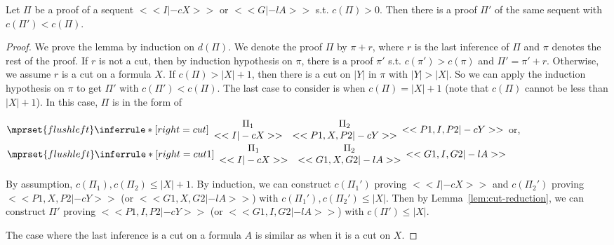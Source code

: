 \begin{lemma}
  \label{lem:less-cut-rank}
  Let $\Pi$ be a proof of a sequent $<<I |-c X>>$ or $<<G |-l A>>$ s.t. $c(\Pi)>0$. Then there
  is a proof $\Pi'$ of the same sequent with $c(\Pi')<c(\Pi)$.
\end{lemma}
\begin{proof}
  We prove the lemma by induction on $d(\Pi)$. We denote the proof $\Pi$ by $\pi+r$, where $r$
  is the last inference of $\Pi$ and $\pi$ denotes the rest of the proof. If $r$ is not a cut,
  then by induction hypothesis on $\pi$, there is a proof $\pi'$ s.t. $c(\pi')>c(\pi)$ and
  $\Pi'=\pi'+r$. Otherwise, we assume $r$ is a cut on a formula $X$. If $c(\Pi)>|X|+1$, then
  there is a cut on $|Y|$ in $\pi$ with $|Y|>|X|$. So we can apply the induction hypothesis
  on $\pi$ to get $\Pi'$ with $c(\Pi')<c(\Pi)$. The last case to consider is when
  $c(\Pi)=|X|+1$ (note that $c(\Pi)$ cannot be less than $|X|+1$). In this case, $\Pi$ is in
  the form of
  \begin{center}
    \scriptsize
    \begin{math}
      $$\mprset{flushleft}
      \inferrule* [right={\tiny cut}] {
        {
          \begin{array}{cc}
            \Pi_1 & \Pi_2 \\
            {<<I |-c X>>} & {<<P1, X, P2 |-c Y>>}
          \end{array}
        }
      }{<<P1, I, P2 |-c Y>>}
    \end{math}
    \qquad\qquad
    or,
    \begin{math}
      $$\mprset{flushleft}
      \inferrule* [right={\tiny cut1}] {
        {
          \begin{array}{cc}
            \Pi_1 & \Pi_2 \\
            {<<I |-c X>>} & {<<G1, X, G2 |-l A>>}
          \end{array}
        }
      }{<<G1, I, G2 |-l A>>}
    \end{math}
  \end{center}
  By assumption, $c(\Pi_1),c(\Pi_2)\leq |X|+1$. By induction, we can construct $c(\Pi_1')$
  proving $<<I |-c X>>$ and $c(\Pi_2')$ proving $<<P1, X, P2 |-c Y>>$ (or
  $<<G1, X, G2 |-l A>>$) with $c(\Pi_1'),c(\Pi_2')\leq |X|$. Then by
  Lemma~\ref{lem:cut-reduction}, we can construct $\Pi'$ proving $<<P1, I, P2 |-c Y>>$ (or
  $<<G1, I, G2 |-l A>>$) with $c(\Pi')\leq |X|$. 

  The case where the last inference is a cut on a formula $A$ is similar as when it is a cut
  on $X$.

\end{proof}

